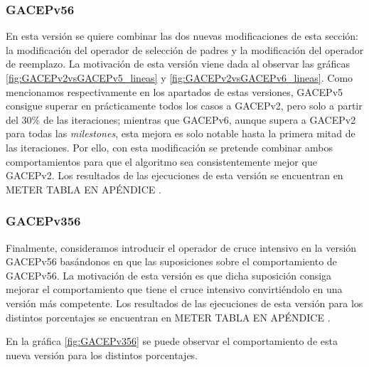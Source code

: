 \subsubsection{GACEPv56}

En esta versión se quiere combinar las dos nuevas modificaciones de esta sección: la modificación del operador de selección de padres y la modificación del operador de reemplazo. 
La motivación de esta versión viene dada al observar las gráficas \ref{fig:GACEPv2vsGACEPv5_lineas} y \ref{fig:GACEPv2vsGACEPv6_lineas}. 
Como mencionamos respectivamente en los apartados de estas versiones, GACEPv5 consigue superar en prácticamente todos los casos a GACEPv2, pero solo a partir del 30\% de las iteraciones; mientras que GACEPv6, aunque supera a GACEPv2 para todas las \textit{milestones}, esta mejora es solo notable hasta la primera mitad de las iteraciones. 
Por ello, con esta modificación se pretende combinar ambos comportamientos para que el algoritmo sea consistentemente mejor que GACEPv2. 
Los resultados de las ejecuciones de esta versión se encuentran en \color{red} METER TABLA EN APÉNDICE \color{black}.


\subsubsection{GACEPv356}

Finalmente, consideramos introducir el operador de cruce intensivo en la versión GACEPv56 basándonos en que las suposiciones sobre el comportamiento de GACEPv56. 
La motivación de esta versión es que dicha suposición consiga mejorar el comportamiento que tiene el cruce intensivo convirtiéndolo en una versión más competente. 
Los resultados de las ejecuciones de esta versión para los distintos porcentajes se encuentran en \color{red} METER TABLA EN APÉNDICE \color{black}. 

En la gráfica \ref{fig:GACEPv356} se puede observar el comportamiento de esta nueva versión para los distintos porcentajes. 

